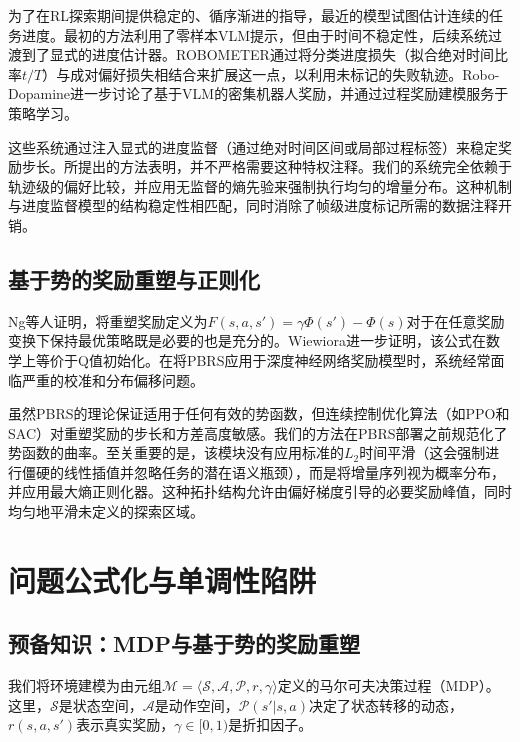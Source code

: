 为了在RL探索期间提供稳定的、循序渐进的指导，最近的模型试图估计连续的任务进度。最初的方法利用了零样本VLM提示，但由于时间不稳定性，后续系统过渡到了显式的进度估计器。ROBOMETER\cite{liang2026}通过将分类进度损失（拟合绝对时间比率$t/T$）与成对偏好损失相结合来扩展这一点，以利用未标记的失败轨迹。Robo-Dopamine\cite{tan2026}进一步讨论了基于VLM的密集机器人奖励，并通过过程奖励建模服务于策略学习。

这些系统通过注入显式的进度监督（通过绝对时间区间或局部过程标签）来稳定奖励步长。所提出的方法表明，并不严格需要这种特权注释。我们的系统完全依赖于轨迹级的偏好比较，并应用无监督的熵先验来强制执行均匀的增量分布。这种机制与进度监督模型的结构稳定性相匹配，同时消除了帧级进度标记所需的数据注释开销。

\subsection{基于势的奖励重塑与正则化}

Ng等人\cite{ng1999}证明，将重塑奖励定义为$F(s, a, s') = \gamma\Phi(s') - \Phi(s)$对于在任意奖励变换下保持最优策略既是必要的也是充分的。Wiewiora\cite{wiewiora2003}进一步证明，该公式在数学上等价于Q值初始化。在将PBRS应用于深度神经网络奖励模型时，系统经常面临严重的校准和分布偏移问题。

虽然PBRS的理论保证适用于任何有效的势函数，但连续控制优化算法（如PPO\cite{schulman2017}和SAC\cite{haarnoja2018}）对重塑奖励的步长和方差高度敏感。我们的方法在PBRS部署之前规范化了势函数的曲率。至关重要的是，该模块没有应用标准的$L_2$时间平滑（这会强制进行僵硬的线性插值并忽略任务的潜在语义瓶颈），而是将增量序列视为概率分布，并应用最大熵正则化器\cite{shannon1948,jaynes1957}。这种拓扑结构允许由偏好梯度引导的必要奖励峰值，同时均匀地平滑未定义的探索区域。



\clearpage
\section{问题公式化与单调性陷阱}

\subsection{预备知识：MDP与基于势的奖励重塑}

我们将环境建模为由元组$\mathcal{M} = \langle \mathcal{S}, \mathcal{A}, \mathcal{P}, r, \gamma \rangle$定义的马尔可夫决策过程（MDP）\cite{sutton2018}。这里，$\mathcal{S}$是状态空间，$\mathcal{A}$是动作空间，$\mathcal{P}(s'|s,a)$决定了状态转移的动态，$r(s,a,s')$表示真实奖励，$\gamma \in [0, 1)$是折扣因子。

